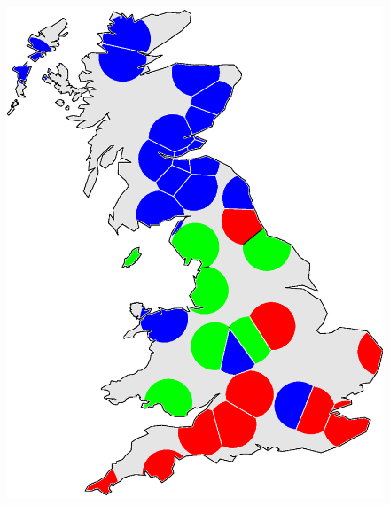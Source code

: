\documentclass[output=paper]{LSP/langsci}
\begin{document}
\begin{figure} [tbp]
\begin{minipage}[b]{0.30\linewidth}
    \includegraphics [keepaspectratio,width=.98\textwidth] {illustrations/wolk_WARD_lingdist_hard.eps}
\end{minipage}
\begin{minipage}[b]{0.30\linewidth}
    \centering

\end{minipage}
\end{figure}
\end{document}
